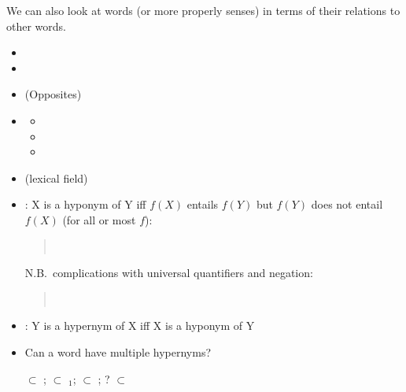 \documentclass[a4paper,landscape,headrule,footrule,xetex]{foils}
\begin{document}

We can also look at words (or more properly senses) in terms of their
relations to other words.

\begin{itemize}
\item {}
\item {}
\item {} (Opposites)
\item {}
    \begin{itemize}
    \item {}
    \item {}
    \item {}
    \end{itemize}
  \item {} (lexical field)
\end{itemize}






\begin{itemize}
\item {}: X is a hyponym of Y iff
  $f(X)$ entails $f(Y)$ but $f(Y)$ does not entail $f(X)$ (for all or most $f$):
  \begin{quote}
    \\
  \end{quote}
  N.B.\ complications with universal quantifiers and negation:
  \begin{quote}
    \\
  \end{quote}
\item {}: Y is a hypernym of X iff X is a hyponym of Y
\item Can a word have multiple hypernyms?
  \begin{exe}
    \ex {} $\subset$ ; $\subset$ $_1$; 
    $\subset$ ; ? $\subset$ 
  \end{exe}
\end{itemize}
\end{document}
